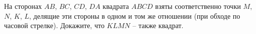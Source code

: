 \begin{ex}
	\begin{condition}
		 На сторонах \( AB \), \( BC \), \( CD \), \( DA  \) квадрата \( ABCD  \) взяты	соответственно точки \( M  \), \( N  \), \( K \), \( L \), делящие эти стороны в одном и том же отношении (при обходе по часовой стрелке). Докажите, что \( KLMN \) – также квадрат.
	\end{condition}
\end{ex}